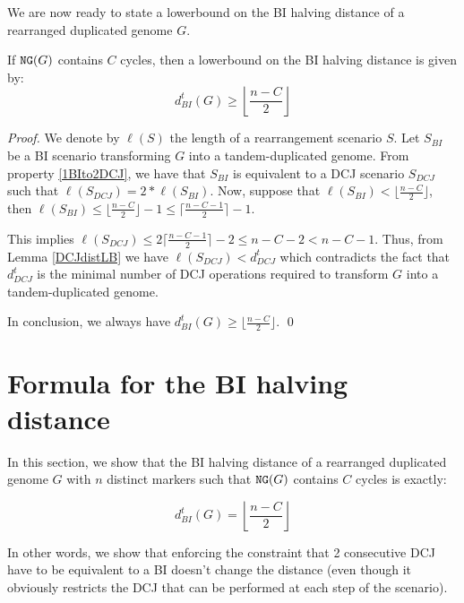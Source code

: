 \documentclass{llncs}
\renewcommand{\NG}{\ensuremath{\mbox{\texttt{NG}}}}
\begin{document}
We are now ready to state a lowerbound on the BI halving distance of a rearranged duplicated genome $G$.

\begin{theorem}
    If $\NG(G)$ contains $C$ cycles, then a lowerbound on the BI halving distance
    is given by: 
$$d^t_{BI}(G) \geq \left \lfloor \frac{n - C}{2} \right \rfloor$$
\end{theorem}

\begin{proof}

We denote by $\ell(S)$ the length of a rearrangement scenario $S$.
   Let $S_{BI}$ be a BI scenario transforming $G$ into a
   tandem-duplicated genome.
    From property \ref{1BIto2DCJ}, we have that $S_{BI}$ is equivalent to
    a DCJ scenario $S_{DCJ}$ such that  $\ell(S_{DCJ})=2*\ell(S_{BI})$. 
    Now, suppose that $\ell(S_{BI}) < \lfloor \frac{n - C}{2}
    \rfloor$, then $\ell(S_{BI}) \leq \lfloor \frac{n - C}{2}
    \rfloor - 1 \leq \lceil \frac{n - C - 1}{2} \rceil - 1$.
    
    This implies $\ell(S_{DCJ}) \leq 2\lceil \frac{n - C - 1}{2}
    \rceil - 2 \leq n - C - 2 < n - C - 1$. Thus, from Lemma 
   \ref{DCJdistLB} we have $\ell(S_{DCJ}) < d^t_{DCJ}$ 
    which contradicts the fact that $d^t_{DCJ}$ is the minimal number
    of DCJ
    operations required to transform $G$ into a tandem-duplicated genome.

    In conclusion, we always have $d^t_{BI}(G) \geq \lfloor \frac{n - C}{2} \rfloor$.  \qed
\end{proof}



\section{Formula for the BI halving distance}
\label{sec:dist}

In this section, we show that the BI halving distance of a rearranged duplicated genome $G$ with $n$ distinct markers such that  $\NG(G)$ contains $C$ cycles is exactly:

$$d^t_{BI}(G) = \left \lfloor \frac{n - C}{2} \right \rfloor$$

In other words, we show that enforcing the constraint that 2 consecutive DCJ have to be equivalent to a BI doesn't change the distance (even though it obviously restricts the DCJ that can be performed at each step of the scenario). 
\end{document}
